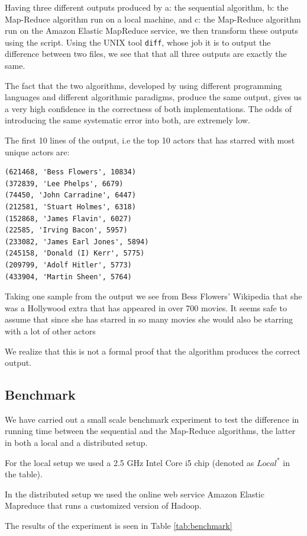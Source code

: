 \documentclass[a4paper,11pt]{article}
\begin{document}
Having three different outputs produced by a: the sequential algorithm, b: the Map-Reduce algorithm run on a local machine, and c: the Map-Reduce algorithm run on the Amazon Elastic MapReduce service, we then transform these outputs using the script.
Using the UNIX tool \texttt{diff}, whose job it is to output the difference between two files, we see that that all three outputs are exactly the same.

The fact that the two algorithms, developed by using different programming languages and different algorithmic paradigms, produce the same output, gives us a very high confidence in the correctness of both implementations. The odds of introducing the same systematic error into both, are extremely low.

The first 10 lines of the output, i.e the top 10 actors that has starred with most unique actors are: 
\begin{verbatim}
(621468, 'Bess Flowers', 10834)
(372839, 'Lee Phelps', 6679)
(74450, 'John Carradine', 6447)
(212581, 'Stuart Holmes', 6318)
(152868, 'James Flavin', 6027)
(22585, 'Irving Bacon', 5957)
(233082, 'James Earl Jones', 5894)
(245158, 'Donald (I) Kerr', 5775)
(209799, 'Adolf Hitler', 5773)
(433904, 'Martin Sheen', 5764)
\end{verbatim}

Taking one sample from the output we see from Bess Flowers' Wikipedia that she was a Hollywood extra that has appeared in over 700 movies. It seems safe to assume that since she has starred in so many movies she would also be starring with a lot of other actors

We realize that this is not a formal proof that the algorithm produces the correct output.

\subsection{Benchmark}
We have carried out a small scale benchmark experiment to test the difference in running time between the sequential and the Map-Reduce algorithms, the latter in both a local and a distributed setup. 

For the local setup we used a 2.5 GHz Intel Core i5 chip (denoted as $Local^*$ in the table). 

In the distributed setup we used the online web service Amazon Elastic Mapreduce that runs a customized version of Hadoop. 

The results of the experiment is seen in Table \ref{tab:benchmark}
\end{document}
